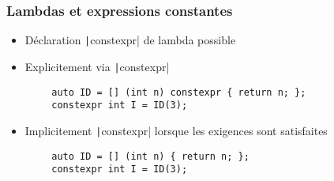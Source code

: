 \documentclass[C++.tex]{subfiles}
\begin{document}
\begin{frame}[fragile]
	\frametitle{Lambdas et expressions constantes}
	\begin{itemize}
		\item Déclaration \texttt|constexpr| de lambda possible 
		\item Explicitement via \texttt|constexpr|
	\end{itemize}

	\begin{verbatim}
		auto ID = [] (int n) constexpr { return n; };
		constexpr int I = ID(3);
	\end{verbatim}

	\begin{itemize}
		\item Implicitement \texttt|constexpr| lorsque les exigences sont satisfaites
	\end{itemize}


	\begin{verbatim}
		auto ID = [] (int n) { return n; };
		constexpr int I = ID(3);
	\end{verbatim}
\end{frame}
\end{document}
